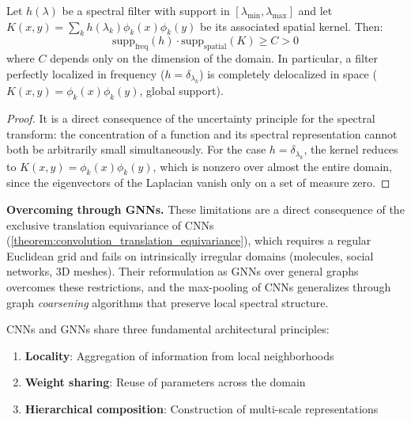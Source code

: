 \begin{proposition}\label{prop:tradeoff_localizacion}
Let $h(\lambda)$ be a spectral filter with support in $[\lambda_{\min}, \lambda_{\max}]$ and let $K(x,y) = \sum_k h(\lambda_k) \phi_k(x)\phi_k(y)$ be its associated spatial kernel. Then:
\begin{equation}
\text{supp}_{\text{freq}}(h) \cdot \text{supp}_{\text{spatial}}(K) \geq C > 0
\end{equation}
where $C$ depends only on the dimension of the domain. In particular, a filter perfectly localized in frequency ($h = \delta_{\lambda_k}$) is completely delocalized in space ($K(x,y) = \phi_k(x)\phi_k(y)$, global support).
\end{proposition}

\begin{proof}
It is a direct consequence of the uncertainty principle for the spectral transform: the concentration of a function and its spectral representation cannot both be arbitrarily small simultaneously. For the case $h = \delta_{\lambda_k}$, the kernel reduces to $K(x,y) = \phi_k(x)\phi_k(y)$, which is nonzero over almost the entire domain, since the eigenvectors of the Laplacian vanish only on a set of measure zero.
\end{proof}

\textbf{Overcoming through GNNs.} These limitations are a direct consequence of the exclusive translation equivariance of CNNs (\autoref{theorem:convolution_translation_equivariance}), which requires a regular Euclidean grid and fails on intrinsically irregular domains (molecules, social networks, 3D meshes). Their reformulation as GNNs over general graphs overcomes these restrictions, and the max-pooling of CNNs generalizes through graph \textit{coarsening} algorithms that preserve local spectral structure.

\begin{proposition}\label{prop:principios_compartidos}
\glspl{CNN} and \glspl{GNN} share three fundamental architectural principles:
\begin{enumerate}
    \item \textbf{Locality}: Aggregation of information from local neighborhoods
    \item \textbf{Weight sharing}: Reuse of parameters across the domain
    \item \textbf{Hierarchical composition}: Construction of multi-scale representations
\end{enumerate}
\end{proposition}

